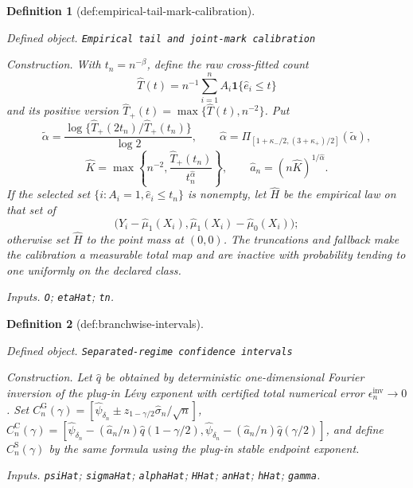 \documentclass{article}
\newtheorem{definition}{Definition}
\begin{document}
\begin{definition}[def:empirical-tail-mark-calibration]\label{def:empirical-tail-mark-calibration}
\par\smallskip\noindent\emph{Defined object.} \texttt{Empirical tail and joint-\allowbreak{}mark calibration}
\par\smallskip\noindent\emph{Construction.} With \(t_n=n^{-\beta}\), define the raw cross-fitted count
\[
 \widehat T(t)=n^{-1}\sum_{i=1}^n A_i\mathbf 1\{\widehat e_i\leq t\}
\]
and its positive version \(\widehat T_+(t)=\max\{\widehat T(t),n^{-2}\}\).  Put
\[
 \widetilde\alpha=\frac{\log\{\widehat T_+(2t_n)/\widehat T_+(t_n)\}}{\log2},\qquad
 \widehat\alpha=\Pi_{[1+\kappa_-/2,(3+\kappa_+)/2]}(\widetilde\alpha),
\]
\[
 \widehat K=\max\!\left\{n^{-2},\frac{\widehat T_+(t_n)}{t_n^{\widehat\alpha}}\right\},
 \qquad \widehat a_n=(n\widehat K)^{1/\widehat\alpha}.
\]
If the selected set \(\{i:A_i=1,\widehat e_i\leq t_n\}\) is nonempty, let \(\widehat H\) be the empirical law on that set of
\[
 \bigl(Y_i-\widehat\mu_1(X_i),\widehat\mu_1(X_i)-\widehat\mu_0(X_i)\bigr);
\]
otherwise set \(\widehat H\) to the point mass at \((0,0)\).  The truncations and fallback make the calibration a measurable total map and are inactive with probability tending to one uniformly on the declared class.
\par\smallskip\noindent\emph{Inputs.} \texttt{O}; \texttt{etaHat}; \texttt{tn}.
\end{definition}

\begin{definition}[def:branchwise-intervals]\label{def:branchwise-intervals}
\par\smallskip\noindent\emph{Defined object.} \texttt{Separated-\allowbreak{}regime confidence intervals}
\par\smallskip\noindent\emph{Construction.} Let \(\widehat q\) be obtained by deterministic one-dimensional Fourier inversion of the plug-in Lévy exponent with certified total numerical error \(\epsilon_n^{\mathrm{inv}}\to0\). Set \(C_n^{\mathrm G}(\gamma)=[\widehat\psi_{\delta_n}\pm z_{1-\gamma/2}\widehat\sigma_n/\sqrt n]\), \(C_n^{\mathrm C}(\gamma)=[\widehat\psi_{\delta_n}-(\widehat a_n/n)\widehat q(1-\gamma/2),\widehat\psi_{\delta_n}-(\widehat a_n/n)\widehat q(\gamma/2)]\), and define \(C_n^{\mathrm S}(\gamma)\) by the same formula using the plug-in stable endpoint exponent.
\par\smallskip\noindent\emph{Inputs.} \texttt{psiHat}; \texttt{sigmaHat}; \texttt{alphaHat}; \texttt{HHat}; \texttt{anHat}; \texttt{hHat}; \texttt{gamma}.
\end{definition}
\end{document}
